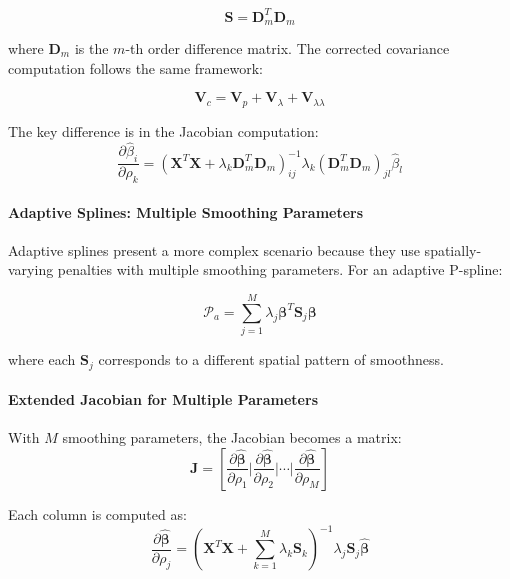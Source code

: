 \documentclass[12pt]{article}
\begin{document}
\begin{equation}
\mathbf{S} = \mathbf{D}_m^T \mathbf{D}_m
\end{equation}

where $\mathbf{D}_m$ is the $m$-th order difference matrix. The corrected covariance computation follows the same framework:

\begin{equation}
\mathbf{V}_c = \mathbf{V}_p + \mathbf{V}_\lambda + \mathbf{V}_{\lambda\lambda}
\end{equation}

The key difference is in the Jacobian computation:
\begin{equation}
\frac{\partial\hat{\beta}_i}{\partial\rho_k} = (\mathbf{X}^T\mathbf{X} + \lambda_k\mathbf{D}_m^T\mathbf{D}_m)^{-1}_{ij} \lambda_k (\mathbf{D}_m^T\mathbf{D}_m)_{jl} \hat{\beta}_l
\end{equation}

\paragraph{Adaptive Splines: Multiple Smoothing Parameters}
Adaptive splines present a more complex scenario because they use spatially-varying penalties with multiple smoothing parameters. For an adaptive P-spline:

\begin{equation}
\mathcal{P}_a = \sum_{j=1}^M \lambda_j \boldsymbol{\beta}^T \mathbf{S}_j \boldsymbol{\beta}
\end{equation}

where each $\mathbf{S}_j$ corresponds to a different spatial pattern of smoothness.

\paragraph{Extended Jacobian for Multiple Parameters}
With $M$ smoothing parameters, the Jacobian becomes a matrix:
\begin{equation}
\mathbf{J} = \left[\frac{\partial\hat{\boldsymbol{\beta}}}{\partial\rho_1} \bigg| \frac{\partial\hat{\boldsymbol{\beta}}}{\partial\rho_2} \bigg| \cdots \bigg| \frac{\partial\hat{\boldsymbol{\beta}}}{\partial\rho_M}\right]
\end{equation}

Each column is computed as:
\begin{equation}
\frac{\partial\hat{\boldsymbol{\beta}}}{\partial\rho_j} = \left(\mathbf{X}^T\mathbf{X} + \sum_{k=1}^M \lambda_k\mathbf{S}_k\right)^{-1} \lambda_j \mathbf{S}_j \hat{\boldsymbol{\beta}}
\end{equation}
\end{document}

